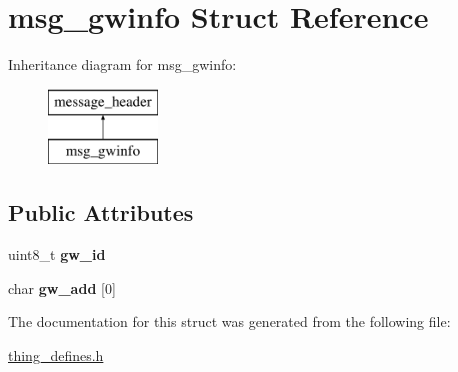 \hypertarget{structmsg__gwinfo}{\section{msg\-\_\-gwinfo Struct Reference}
\label{structmsg__gwinfo}
}
Inheritance diagram for msg\-\_\-gwinfo\-:\begin{figure}[H]
\begin{center}
\leavevmode
\includegraphics[height=2.000000cm]{structmsg__gwinfo}
\end{center}
\end{figure}
\subsection*{Public Attributes}
\begin{DoxyCompactItemize}
\item 
\hypertarget{structmsg__gwinfo_a726983d8610681306248b0a6d49b09f0}{uint8\-\_\-t {\bfseries gw\-\_\-id}}\label{structmsg__gwinfo_a726983d8610681306248b0a6d49b09f0}

\item 
\hypertarget{structmsg__gwinfo_a7895025f94b89f5f0737caa659313b86}{char {\bfseries gw\-\_\-add} \mbox{[}0\mbox{]}}\label{structmsg__gwinfo_a7895025f94b89f5f0737caa659313b86}

\end{DoxyCompactItemize}


The documentation for this struct was generated from the following file\-:\begin{DoxyCompactItemize}
\item 
\hyperlink{thing__defines_8h}{thing\-\_\-defines.\-h}\end{DoxyCompactItemize}
